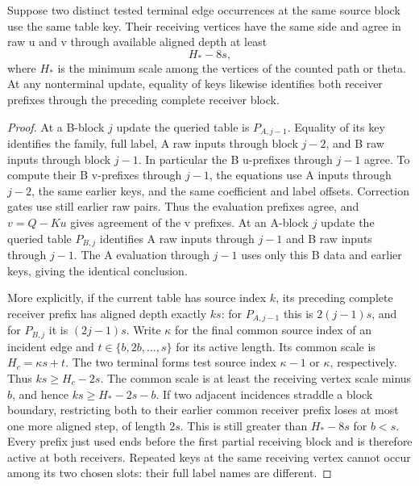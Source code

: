 \begin{lemma}
\label{lem:pruning-key-prefix}
Suppose two distinct tested terminal edge occurrences at the same
source block use the same table key.  Their receiving vertices
have the same side and agree in raw u and v through available
aligned depth at least
\[
  H_*-8s,
\]
where $H_*$ is the minimum scale among the vertices of the counted
path or theta.  At any nonterminal update, equality of keys
likewise identifies both receiver prefixes through the preceding
complete receiver block.
\end{lemma}

\begin{proof}
At a B-block $j$ update the queried table is $P_{A,j-1}$.  Equality
of its key identifies the family, full label, A raw inputs through
block $j-2$, and B raw inputs through block $j-1$.  In particular
the B u-prefixes through $j-1$ agree.  To compute their B
v-prefixes through $j-1$, the equations use A inputs through
$j-2$, the same earlier keys, and the same coefficient and label
offsets.  Correction gates use still earlier raw pairs.  Thus the
evaluation prefixes agree, and $v=Q-Ku$ gives agreement of the v
prefixes.  At an A-block $j$ update the queried table $P_{B,j}$
identifies A raw inputs through $j-1$ and B raw inputs through
$j-1$.  The A evaluation through $j-1$ uses only this B data and
earlier keys, giving the identical conclusion.

More explicitly, if the current table has source index $k$, its
preceding complete receiver prefix has aligned depth exactly $ks$:
for $P_{A,j-1}$ this is $2(j-1)s$, and for $P_{B,j}$ it is
$(2j-1)s$.  Write $\kappa$ for the final common source index of
an incident edge and $t\in\{b,2b,\ldots,s\}$ for its active
length.  Its common scale is $H_c=\kappa s+t$.  The two
terminal forms test source index $\kappa-1$ or $\kappa$,
respectively.  Thus $ks\geq H_c-2s$.  The common scale is at
least the receiving vertex scale minus $b$, and hence
$ks\geq H_*-2s-b$.  If two adjacent incidences straddle a
block boundary, restricting both to their earlier common
receiver prefix loses at most one more aligned step, of length
$2s$.  This is still greater than $H_*-8s$ for $b<s$.
Every prefix just used ends before the first partial receiving
block and is therefore active at both receivers.
Repeated keys at the same receiving vertex cannot occur among
its two chosen slots: their full label names are different.
\end{proof}

